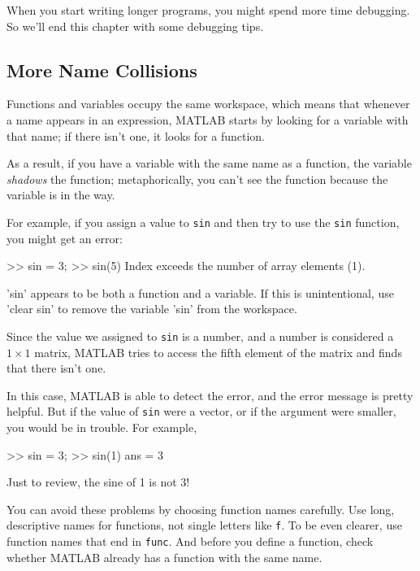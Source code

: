 When you start writing longer programs, you might spend more time debugging.  So we'll end this chapter with some debugging tips.

\subsection{More Name Collisions}

Functions and variables occupy the same workspace, which means
that whenever a name appears in an expression, MATLAB starts by looking
for a variable with that name; if there isn't one, it looks for
a function.


As a result, if you have a variable with the same name as a function,
the variable \emph{shadows} the function; metaphorically, you can't see the function because the variable is in the way.

For example, if you assign
a value to \lstinline{sin} and then try to use the \lstinline{sin} function, you
might get an error:

\begin{code}
>> sin = 3;
>> sin(5)
Index exceeds the number of array elements (1).

'sin' appears to be both a function and a variable.
If this is unintentional, use 'clear sin' to remove
the variable 'sin' from the workspace.
\end{code}

Since the value we assigned to \lstinline{sin} is a number, and a number is considered a $1 \times 1$ matrix, MATLAB tries to access the fifth element of the matrix and finds that there isn't one.

In this case, MATLAB is able to detect the error, and the error message is pretty helpful.
But if the value of \lstinline{sin} were a vector, or if the argument were smaller, you would be in trouble.  For example,

\begin{code}
>> sin = 3;
>> sin(1)
ans = 3
\end{code}

Just to review, the sine of 1 is not 3!

You can avoid these problems by choosing function names carefully. Use long, descriptive names for functions, not single letters like \lstinline{f}. To be even clearer, use function names that end in \lstinline{func}. And before you define a function, check whether MATLAB already has a function with the same name.

